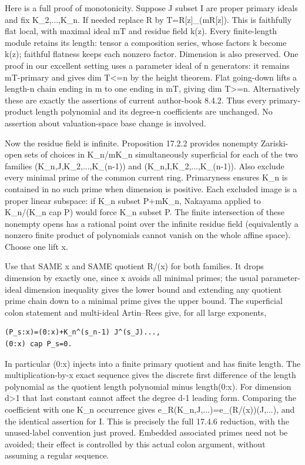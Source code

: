 \documentclass[11pt]{article}
\begin{document}
Here is a full proof of monotonicity. Suppose J subset I are proper primary ideals and fix K\_2,...,K\_n. If needed replace R by T=R[z]\_(mR[z]). This is faithfully flat local, with maximal ideal mT and residue field k(z). Every finite-length module retains its length: tensor a composition series, whose factors k become k(z); faithful flatness keeps each nonzero factor. Dimension is also preserved. One proof in our excellent setting uses a parameter ideal of n generators: it remains mT-primary and gives dim T<=n by the height theorem. Flat going-down lifts a length-n chain ending in m to one ending in mT, giving dim T>=n. Alternatively these are exactly the assertions of current author-book 8.4.2. Thus every primary-product length polynomial and its degree-n coefficients are unchanged. No assertion about valuation-space base change is involved.

Now the residue field is infinite. Proposition 17.2.2 provides nonempty Zariski-open sets of choices in K\_n/mK\_n simultaneously superficial for each of the two families (K\_n,J,K\_2,...,K\_(n-1)) and (K\_n,I,K\_2,...,K\_(n-1)). Also exclude every minimal prime of the common current ring. Primaryness ensures K\_n is contained in no such prime when dimension is positive. Each excluded image is a proper linear subspace: if K\_n subset P+mK\_n, Nakayama applied to K\_n/(K\_n cap P) would force K\_n subset P. The finite intersection of these nonempty opens has a rational point over the infinite residue field (equivalently a nonzero finite product of polynomials cannot vanish on the whole affine space). Choose one lift x.

Use that SAME x and SAME quotient R/(x) for both families. It drops dimension by exactly one, since x avoids all minimal primes; the usual parameter-ideal dimension inequality gives the lower bound and extending any quotient prime chain down to a minimal prime gives the upper bound. The superficial colon statement and multi-ideal Artin--Rees give, for all large exponents,

\begin{Verbatim}[fontsize=\small,breaklines=true,breakanywhere=true]
(P_s:x)=(0:x)+K_n^(s_n-1) J^(s_J)...,
(0:x) cap P_s=0.
\end{Verbatim}

In particular (0:x) injects into a finite primary quotient and has finite length. The multiplication-by-x exact sequence gives the discrete first difference of the length polynomial as the quotient length polynomial minus length(0:x). For dimension d>1 that last constant cannot affect the degree d-1 leading form. Comparing the coefficient with one K\_n occurrence gives e\_R(K\_n,J,...)=e\_(R/(x))(J,...), and the identical assertion for I. This is precisely the full 17.4.6 reduction, with the unused-label convention just proved. Embedded associated primes need not be avoided; their effect is controlled by this actual colon argument, without assuming a regular sequence.
\end{document}
